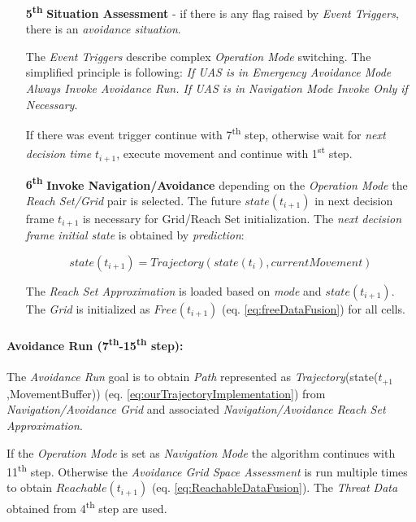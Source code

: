 \begin{itemize}
    \item[\textbf{5\textsuperscript{th}}] \textbf{Situation Assessment} - if there is any flag raised by \emph{Event Triggers}, there is an \emph{avoidance situation}.
    
    The \emph{Event Triggers} describe complex \emph{Operation Mode} switching. The simplified principle is following: \emph{If UAS is in Emergency Avoidance Mode Always Invoke Avoidance Run. If UAS is in Navigation Mode Invoke Only if Necessary}.
    
    If there was event trigger continue with 7\textsuperscript{th} step, otherwise wait for \emph{next decision time} $t_{i+1}$, execute movement and continue with 1\textsuperscript{st} step.
    
    \item[\textbf{6\textsuperscript{th}}] \textbf{Invoke Navigation/Avoidance} depending on the \emph{Operation Mode} the \emph{Reach Set/Grid} pair is selected. The future $state(t_{i+1})$ in next decision frame $t_{i+1}$ is necessary for Grid/Reach Set initialization. The \emph{next decision frame initial state} is obtained by \emph{prediction}:
    
    \begin{equation*}
        state(t_{i+1}) =  Trajectory(state(t_i),current Movement)
    \end{equation*}
    
    The \emph{Reach Set Approximation} is loaded based on \emph{mode} and $state(t_{i+1})$. The \emph{Grid} is initialized as $Free(t_{i+1})$ (eq. \ref{eq:freeDataFusion}) for all cells.
\end{itemize}



\paragraph{Avoidance Run (7\textsuperscript{th}-15\textsuperscript{th} step):} The \emph{Avoidance Run} goal is to obtain \emph{Path} represented as \emph{Trajectory}(state($t_{+1}$,MovementBuffer)) (eq. \ref{eq:ourTrajectoryImplementation}) from \emph{Navigation/Avoidance Grid} and associated \emph{Navigation/Avoidance Reach Set Approximation}.

If the \emph{Operation Mode} is set as \emph{Navigation Mode} the algorithm continues with 11\textsuperscript{th} step. Otherwise the \emph{Avoidance Grid Space Assessment} is run multiple times to obtain $Reachable(t_{i+1})$ (eq. \ref{eq:ReachableDataFusion}). The \emph{Threat Data} obtained from 4\textsuperscript{th} step are used. 

